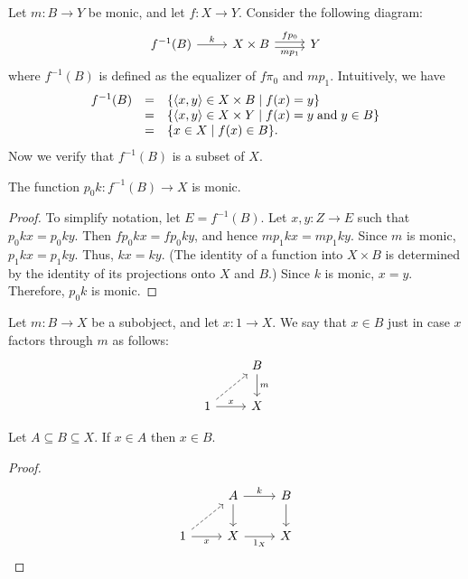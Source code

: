 Let $m:B\to Y$ be monic, and let $f:X\to Y$.  Consider the following
diagram:
  \[ \begin{tikzcd} f^{-1}(B) \arrow{r}{k} & X\times B \arrow[shift
    left=0.5ex]{r}[above]{fp _0} \arrow[shift
    right=0.5ex]{r}[below]{mp _1} & Y \end{tikzcd} \] where
  $f^{-1}(B)$ is defined as the equalizer of $f\pi _0$ and $mp_1$.
  Intuitively, we have
\[ \begin{array}{l l l}
f^{-1}(B) & = &  \{ \langle x,y\rangle \in X\times B\mid f(x)=y \} \\
& = & \{ \langle x,y\rangle \in X\times Y \mid f(x)=y \; \text{and} \; y\in B \} \\
& = & \{ x\in X \mid f(x)\in B \} .\end{array} \]
Now we verify that $f^{-1}(B)$ is a subset of $X$.

\begin{prop} The function $p_0k:f^{-1}(B)\to X$ is monic. \end{prop}

\begin{proof} To simplify notation, let $E=f^{-1}(B)$.  Let $x,y:Z\to
  E$ such that $p_0kx=p_0ky$.  Then $fp_0kx=fp_0ky$, and hence
  $mp_1kx=mp_1ky$.  Since $m$ is monic, $p_1kx=p_1ky$.  Thus, $kx=ky$.
  (The identity of a function into $X\times B$ is determined by the
  identity of its projections onto $X$ and $B$.)  Since $k$ is monic,
  $x=y$.  Therefore, $p_0k$ is monic.
\end{proof}

\begin{defn} Let $m:B\to X$ be a subobject, and let $x:1\to X$.  We
  say that $x\in B$ just in case $x$ factors through $m$ as follows:
\[ \begin{tikzcd} 
                                  & B \arrow{d}{m} \\
1 \arrow{r}{x} \arrow[dashed]{ur} &
X              \end{tikzcd} \] \end{defn}

\begin{prop} Let $A\subseteq B\subseteq X$.  If $x\in A$ then $x\in
  B$. \end{prop}

\begin{proof}
\[ \begin{tikzcd}
               & A \arrow{d} \arrow{r}{k} & B \arrow{d} \\
1 \arrow[r,"x"'] \arrow[dashed] {ur} & X \arrow[r,"1_X"']         & X \end{tikzcd} \] 
\end{proof}

